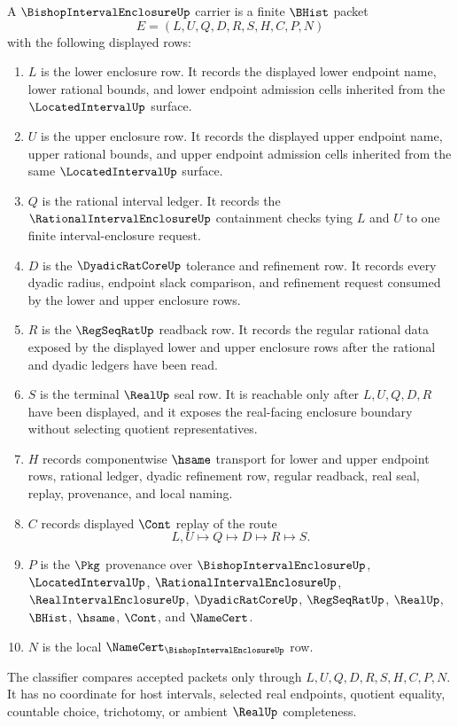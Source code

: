\begin{definition}
\label{def:bishop-interval-enclosure-carrier}
A $\BishopIntervalEnclosureUp$ carrier is a finite $\BHist$ packet
$$
E=(L,U,Q,D,R,S,H,C,P,N)
$$
with the following displayed rows:
\begin{enumerate}
\item $L$ is the lower enclosure row. It records the displayed lower endpoint name, lower rational bounds, and lower endpoint admission cells inherited from the $\LocatedIntervalUp$ surface.
\item $U$ is the upper enclosure row. It records the displayed upper endpoint name, upper rational bounds, and upper endpoint admission cells inherited from the same $\LocatedIntervalUp$ surface.
\item $Q$ is the rational interval ledger. It records the $\RationalIntervalEnclosureUp$ containment checks tying $L$ and $U$ to one finite interval-enclosure request.
\item $D$ is the $\DyadicRatCoreUp$ tolerance and refinement row. It records every dyadic radius, endpoint slack comparison, and refinement request consumed by the lower and upper enclosure rows.
\item $R$ is the $\RegSeqRatUp$ readback row. It records the regular rational data exposed by the displayed lower and upper enclosure rows after the rational and dyadic ledgers have been read.
\item $S$ is the terminal $\RealUp$ seal row. It is reachable only after $L,U,Q,D,R$ have been displayed, and it exposes the real-facing enclosure boundary without selecting quotient representatives.
\item $H$ records componentwise $\hsame$ transport for lower and upper endpoint rows, rational ledger, dyadic refinement row, regular readback, real seal, replay, provenance, and local naming.
\item $C$ records displayed $\Cont$ replay of the route
$$
L,U \longmapsto Q \longmapsto D \longmapsto R \longmapsto S .
$$
\item $P$ is the $\Pkg$ provenance over $\BishopIntervalEnclosureUp$, $\LocatedIntervalUp$, $\RationalIntervalEnclosureUp$, $\RealIntervalEnclosureUp$, $\DyadicRatCoreUp$, $\RegSeqRatUp$, $\RealUp$, $\BHist$, $\hsame$, $\Cont$, and $\NameCert$.
\item $N$ is the local $\NameCert_{\BishopIntervalEnclosureUp}$ row.
\end{enumerate}
The classifier compares accepted packets only through $L,U,Q,D,R,S,H,C,P,N$. It has no coordinate for host intervals, selected real endpoints, quotient equality, countable choice, trichotomy, or ambient $\RealUp$ completeness.
\end{definition}

